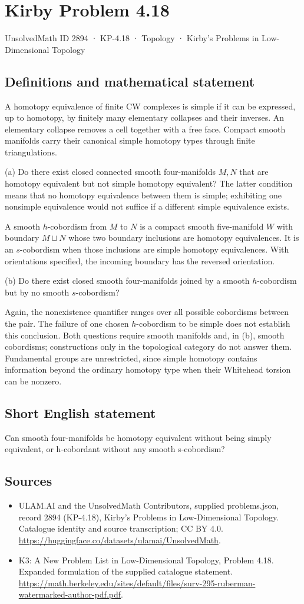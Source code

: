 \documentclass[11pt,a4paper]{article}
\begin{document}
\section*{Kirby Problem 4.18}\label{2894}
{\small UnsolvedMath ID 2894 · KP-4.18 · Topology · Kirby's Problems in Low-Dimensional Topology}
\subsection{Definitions and mathematical statement}
A homotopy equivalence of finite CW complexes is simple if it can be expressed, up to homotopy, by finitely many elementary collapses and their inverses. An elementary collapse removes a cell together with a free face. Compact smooth manifolds carry their canonical simple homotopy types through finite triangulations.

(a) Do there exist closed connected smooth four-manifolds $M,N$ that are homotopy equivalent but not simple homotopy equivalent? The latter condition means that no homotopy equivalence between them is simple; exhibiting one nonsimple equivalence would not suffice if a different simple equivalence exists.

A smooth $h$-cobordism from $M$ to $N$ is a compact smooth five-manifold $W$ with boundary $M\sqcup N$ whose two boundary inclusions are homotopy equivalences. It is an $s$-cobordism when those inclusions are simple homotopy equivalences. With orientations specified, the incoming boundary has the reversed orientation.

(b) Do there exist closed smooth four-manifolds joined by a smooth $h$-cobordism but by no smooth $s$-cobordism?

Again, the nonexistence quantifier ranges over all possible cobordisms between the pair. The failure of one chosen $h$-cobordism to be simple does not establish this conclusion. Both questions require smooth manifolds and, in (b), smooth cobordisms; constructions only in the topological category do not answer them. Fundamental groups are unrestricted, since simple homotopy contains information beyond the ordinary homotopy type when their Whitehead torsion can be nonzero.
\subsection{Short English statement}
Can smooth four-manifolds be homotopy equivalent without being simply equivalent, or h-cobordant without any smooth s-cobordism?
\subsection{Sources}
\begin{itemize}
\item[S1] ULAM.AI and the UnsolvedMath Contributors, supplied problems.json, record 2894 (KP-4.18), Kirby's Problems in Low-Dimensional Topology. Catalogue identity and source transcription; CC BY 4.0.
\url{https://huggingface.co/datasets/ulamai/UnsolvedMath}.
\item[S2] K3: A New Problem List in Low-Dimensional Topology, Problem 4.18. Expanded formulation of the supplied catalogue statement.
\url{https://math.berkeley.edu/sites/default/files/surv-295-ruberman-watermarked-author-pdf.pdf}.
\end{itemize}
\end{document}
